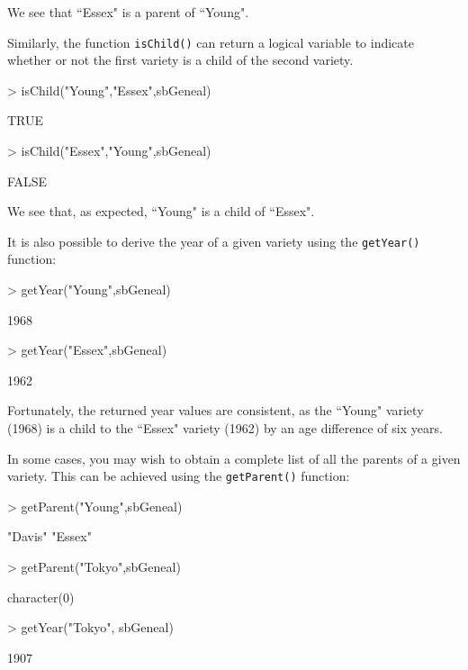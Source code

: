 \documentclass{article}
\numberwithin{equation}{section} %
\begin{document}
We see that ``Essex" is a parent of ``Young".

Similarly, the function \texttt{isChild()} can return a logical variable to indicate whether or not the first variety is a child of the second variety.

\begin{Schunk}
\begin{Sinput}
> isChild("Young","Essex",sbGeneal)
\end{Sinput}
\begin{Soutput}
[1] TRUE
\end{Soutput}
\begin{Sinput}
> isChild("Essex","Young",sbGeneal)
\end{Sinput}
\begin{Soutput}
[1] FALSE
\end{Soutput}
\end{Schunk}

We see that, as expected, ``Young" is a child of ``Essex".

It is also possible to derive the year of a given variety using the \texttt{getYear()} function:

\begin{Schunk}
\begin{Sinput}
> getYear("Young",sbGeneal)
\end{Sinput}
\begin{Soutput}
[1] 1968
\end{Soutput}
\begin{Sinput}
> getYear("Essex",sbGeneal)
\end{Sinput}
\begin{Soutput}
[1] 1962
\end{Soutput}
\end{Schunk}

Fortunately, the returned year values are consistent, as the ``Young" variety (1968) is a child to the ``Essex" variety (1962) by an age difference of six years.

In some cases, you may wish to obtain a complete list of all the parents of a given variety. This can be achieved using the \texttt{getParent()} function:

\begin{Schunk}
\begin{Sinput}
> getParent("Young",sbGeneal)
\end{Sinput}
\begin{Soutput}
[1] "Davis" "Essex"
\end{Soutput}
\begin{Sinput}
> getParent("Tokyo",sbGeneal)
\end{Sinput}
\begin{Soutput}
character(0)
\end{Soutput}
\begin{Sinput}
> getYear("Tokyo", sbGeneal)
\end{Sinput}
\begin{Soutput}
[1] 1907
\end{Soutput}
\end{Schunk}
\end{document}
